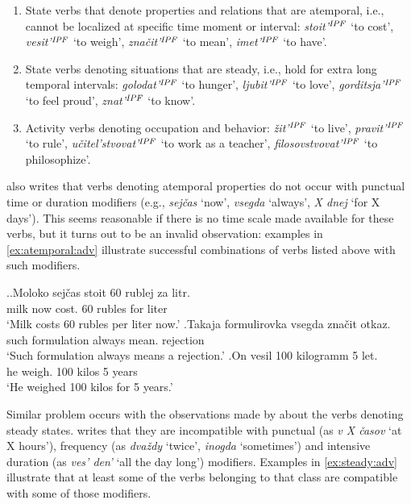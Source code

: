 \begin{enumerate}
\item State verbs that denote properties and relations that are atemporal, i.e., cannot be localized at specific time moment or interval: \textit{stoit'}$^{\mathit{IPF}}$ `to cost', \textit{vesit'}$^{\mathit{IPF}}$ `to weigh', \textit{zna\v{c}it'}$^{\mathit{IPF}}$ `to mean', \textit{imet'}$^{\mathit{IPF}}$ `to have'.
\item State verbs denoting situations that are steady,  i.e., hold for extra long temporal intervals: \textit{golodat'}$^{\mathit{IPF}}$ `to hunger', \textit{ljubit'}$^{\mathit{IPF}}$ `to love', \textit{gorditsja'}$^{\mathit{IPF}}$ `to feel proud', \textit{znat'}$^{\mathit{IPF}}$ `to know'.
\item Activity verbs denoting occupation and behavior: \textit{\v{z}it'}$^{\mathit{IPF}}$ `to live', \textit{pravit'}$^{\mathit{IPF}}$ `to rule', \textit{u\v{c}itel'stvovat'}$^{\mathit{IPF}}$ `to work as a teacher', \textit{filosovstvovat'}$^{\mathit{IPF}}$ `to philosophize'.
\end{enumerate}

\citet{Paducheva:96} also writes that verbs denoting atemporal properties do not occur with punctual time or duration modifiers (e.g., \textit{sej\v{c}as} `now', \textit{vsegda} `always', \textit{X dnej} `for X days'). This seems reasonable if there is no time scale made available for these verbs, but it turns out to be an invalid observation: examples in \ref{ex:atemporal:adv} illustrate successful combinations of verbs listed above with such modifiers.


\ex.\label{ex:atemporal:adv}\ag.Moloko sej\v{c}as stoit 60 rublej za litr.\\
milk now cost. 60 rubles for liter\\
\vspace{0.5em}
`Milk costs 60 rubles per liter now.'
\bg.Takaja formulirovka vsegda zna\v{c}it otkaz.\\
such formulation always mean. rejection\\
\vspace{0.5em}
`Such formulation always means a rejection.'
\bg.On vesil 100 kilogramm 5 let.\\
he weigh. 100 kilos 5 years\\
\vspace{0.5em}
`He weighed 100 kilos for 5 years.'

Similar problem occurs with the observations made by \citet{Paducheva:96} about the verbs denoting steady states. \citet{Paducheva:96} writes that they are incompatible with punctual (as \textit{v X \v{c}asov} `at X hours'), frequency (as \textit{dva\v{z}dy} `twice', \textit{inogda} `sometimes') and intensive duration  (as \textit{ves' den'} `all the day long') modifiers. Examples in \ref{ex:steady:adv} illustrate that at least some of the verbs belonging to that class are compatible with some of those modifiers.

